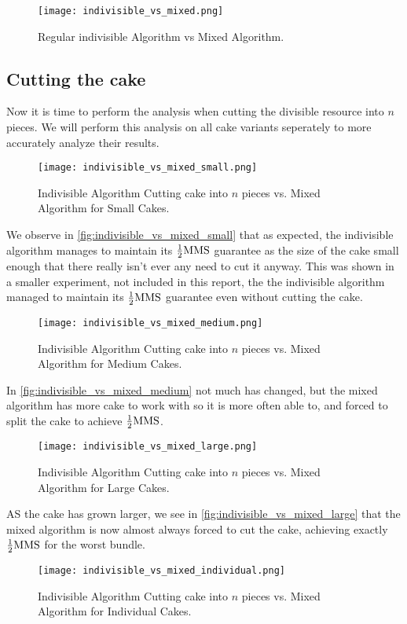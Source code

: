 \begin{figure}
    \centering
    \texttt{[image: indivisible\_vs\_mixed.png]}
    \caption{Regular indivisible Algorithm vs Mixed Algorithm.}
    \label{fig:indivisible_vs_mixed}
\end{figure}

\subsection{Cutting the cake}

Now it is time to perform the analysis when cutting the divisible resource into $n$ pieces. We will perform this analysis on all cake variants seperately to more accurately analyze their results.

\begin{figure}
    \centering
    \texttt{[image: indivisible\_vs\_mixed\_small.png]}
    \caption{Indivisible Algorithm Cutting cake into $n$ pieces vs. Mixed Algorithm for Small Cakes.}
    \label{fig:indivisible_vs_mixed_small}
\end{figure}

We observe in \autoref{fig:indivisible_vs_mixed_small} that as expected, the indivisible algorithm manages to maintain its $\frac{1}{2}\text{MMS}$ guarantee as the size of the cake small enough that there really isn't ever any need to cut it anyway. This was shown in a smaller experiment, not included in this report, the the indivisible algorithm managed to maintain its $\frac{1}{2}\text{MMS}$ guarantee even without cutting the cake.
\begin{figure}
    \centering
    \texttt{[image: indivisible\_vs\_mixed\_medium.png]}
    \caption{Indivisible Algorithm Cutting cake into $n$ pieces vs. Mixed Algorithm for Medium Cakes.}
    \label{fig:indivisible_vs_mixed_medium}
\end{figure}
In \autoref{fig:indivisible_vs_mixed_medium} not much has changed, but the mixed algorithm has more cake to work with so it is more often able to, and forced to split the cake to achieve $\frac{1}{2}\text{MMS}$.
\begin{figure}
    \centering
    \texttt{[image: indivisible\_vs\_mixed\_large.png]}
    \caption{Indivisible Algorithm Cutting cake into $n$ pieces vs. Mixed Algorithm for Large Cakes.}
    \label{fig:indivisible_vs_mixed_large}
\end{figure}
AS the cake has grown larger, we see in \autoref{fig:indivisible_vs_mixed_large} that the mixed algorithm is now almost always forced to cut the cake, achieving exactly $\frac{1}{2}\text{MMS}$ for the worst bundle.
\begin{figure}
    \centering
    \texttt{[image: indivisible\_vs\_mixed\_individual.png]}
    \caption{Indivisible Algorithm Cutting cake into $n$ pieces vs. Mixed Algorithm for Individual Cakes.}
    \label{fig:indivisible_vs_mixed_individual}
\end{figure}




